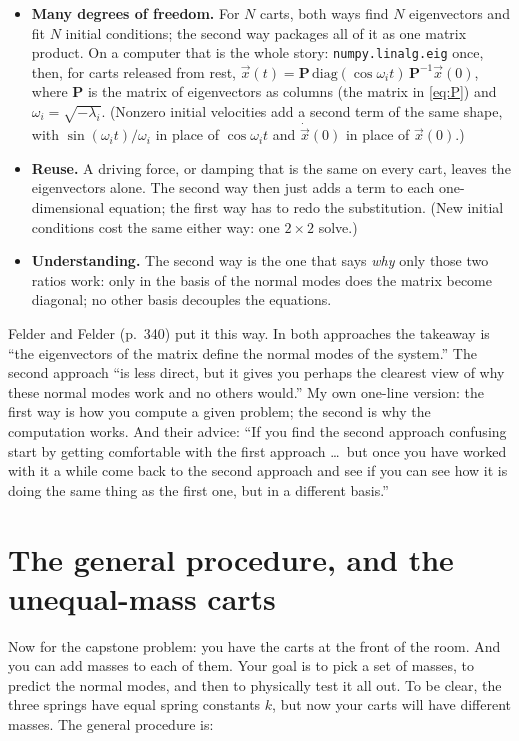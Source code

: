 \documentclass[12pt]{article}
\numberwithin{equation}{section}
\begin{document}
\begin{itemize}
\item \textbf{Many degrees of freedom.} For $N$ carts, both ways find $N$
  eigenvectors and fit $N$ initial conditions; the second way packages
  all of it as one matrix product. On a computer that is the whole story:
  \texttt{numpy.linalg.eig} once, then, for carts released from rest,
  $\vec{x}(t) = \mathbf{P}\,\mathrm{diag}(\cos\omega_i t)\,\mathbf{P}^{-1}\vec{x}(0)$,
  where $\mathbf{P}$ is the matrix of eigenvectors as columns (the matrix
  in \eqref{eq:P}) and $\omega_i = \sqrt{-\lambda_i}$. (Nonzero initial velocities add a
    second term of the same shape, with $\sin(\omega_i t)/\omega_i$ in place of $\cos\omega_i
    t$ and $\dot{\vec{x}}(0)$ in place of $\vec{x}(0)$.)
\item \textbf{Reuse.} A driving force, or damping that is the same on every
  cart, leaves the eigenvectors alone. The second way then just adds a
  term to each one-dimensional equation; the first way has to redo the
  substitution. (New initial conditions cost the same either way: one
  $2\times 2$ solve.)
\item \textbf{Understanding.} The second way is the one that says
  \emph{why} only those two ratios work: only in the basis of the normal
  modes does the matrix become diagonal; no other basis decouples the
  equations.
\end{itemize}

Felder and Felder (p.~340) put it this way. In both approaches the
takeaway is ``the eigenvectors of the matrix define the normal modes of
the system.'' The second approach ``is less direct, but it gives you
perhaps the clearest view of why these normal modes work and no others
would.'' My own one-line version: the first way is how you compute a
given problem; the second is why the computation works. And their advice:
``If you find the
second approach confusing start by getting comfortable with the first
approach \ldots\ but once you have worked with it a while come back to
the second approach and see if you can see how it is doing the same thing
as the first one, but in a different basis.''

\newpage
\section{The general procedure, and the unequal-mass carts}
\label{sec:procedure}

Now for the capstone problem: you have the carts at the front of the room. And
you can add masses to each of them. Your goal is to pick a set of masses, to
predict the normal modes, and then to physically test it all out. To be clear,
the three springs have equal spring constants $k$, but now your carts will have
different masses. The general procedure is:
\end{document}
